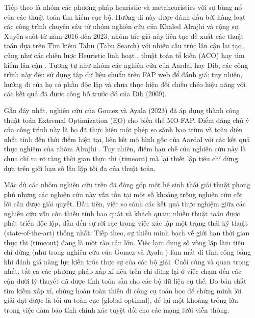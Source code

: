 \documentclass[letterpaper,journal]{IEEEtran}
\begin{document}
Tiếp theo là nhóm các phương pháp heuristic và metaheuristics với sự bùng nổ của các thuật toán tìm kiếm cục bộ. Hướng đi này được đánh dấu bởi hàng loạt các công trình chuyên sâu từ nhóm nghiên cứu của Khaled Alrajhi và cộng sự. Xuyên suốt từ năm 2016 đến 2023, nhóm tác giả này liên tục đề xuất các thuật toán dựa trên Tìm kiếm Tabu (Tabu Search) với nhiều cấu trúc lân cận lai tạo \cite{Alrajhi2016_Dynamic, Alrajhi2016_Hybridized}, cũng như các chiến lược Heuristic linh hoạt \cite{Alrajhi2017_Heuristic}, thuật toán tổ kiến (ACO) \cite{Alrajhi2023DynamicACO} hay tìm kiếm lân cận \cite{Alrajhi2023Neighborhood}. Tương tự như nhóm các nghiên cứu của Aardal hay Dib, các công trình này đều sử dụng tập dữ liệu chuẩn trên FAP web để đánh giá; tuy nhiên, hướng đi của họ có phần độc lập và chưa thực hiện đối chiếu chéo hiệu năng với các kết quả đã được công bố trước đó của Dib (2009).

Gần đây nhất, nghiên cứu của Gomez và Ayala (2023) \cite{Gomez2023MO} đã áp dụng thành công thuật toán Extremal Optimization (EO) cho biến thể MO-FAP. Điểm đáng chú ý của công trình này là họ đã thực hiện một phép so sánh bao trùm và toàn diện nhất tính đến thời điểm hiện tại, liên kết mô hình gốc của Aardal \cite{Aardal2007} với các kết quả thực nghiệm của nhóm Alrajhi \cite{Alrajhi2016_Hybridized}. Tuy nhiên, điểm hạn chế của nghiên cứu này là chưa chỉ ra rõ ràng thời gian thực thi (timeout) mà lại thiết lập tiêu chí dừng dựa trên giới hạn số lần lặp tối đa của thuật toán.

Mặc dù các nhóm nghiên cứu trên đã đóng góp một hệ sinh thái giải thuật phong phú nhưng các nghiên cứu này vẫn tồn tại một số khoảng trống nghiên cứu cốt lõi cần được giải quyết. Đầu tiên, việc so sánh các kết quả thực nghiệm giữa các nghiên cứu vẫn còn thiếu tính bao quát và khách quan; nhiều thuật toán được phát triển độc lập, dẫn đến sự rời rạc trong việc xác lập một trạng thái kỹ thuật (state-of-the-art) thống nhất. Tiếp theo, sự thiếu minh bạch về giới hạn thời gian thực thi (timeout) đang là một rào cản lớn. Việc lạm dụng số vòng lặp làm tiêu chí dừng (như trong nghiên cứu của Gomez và Ayala \cite{Gomez2023MO}) làm mất đi tính công bằng khi đánh giá năng lực kiến trúc thực sự của các bộ giải. Cuối cùng và quan trọng nhất, tất cả các phương pháp xấp xỉ nêu trên chỉ dừng lại ở việc chạm đến các cận dưới lý thuyết đã được tính toán sẵn cho các bộ dữ liệu cụ thể. Do bản chất tìm kiếm xấp xỉ, chúng hoàn toàn thiếu đi công cụ toán học để chứng minh lời giải đạt được là tối ưu toàn cục (global optimal), để lại một khoảng trống lớn trong việc đảm bảo tính chính xác tuyệt đối cho các mạng lưới viễn thông.
\end{document}
